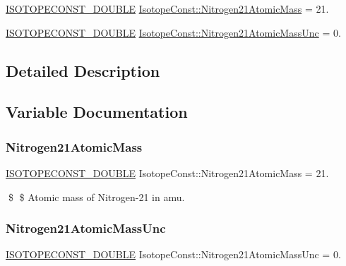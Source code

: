 \begin{DoxyCompactItemize}
\item 
\mbox{\hyperlink{group___isotope_const-_macros_ga8f45a7272ce02c0b4c65c44636ed719a}{I\+S\+O\+T\+O\+P\+E\+C\+O\+N\+S\+T\+\_\+\+D\+O\+U\+B\+LE}} \mbox{\hyperlink{group___isotope_const-_nitrogen-_n21_gabe10a45c94633701c7645c12357b7ab1}{Isotope\+Const\+::\+Nitrogen21\+Atomic\+Mass}} = 21.
\item 
\mbox{\hyperlink{group___isotope_const-_macros_ga8f45a7272ce02c0b4c65c44636ed719a}{I\+S\+O\+T\+O\+P\+E\+C\+O\+N\+S\+T\+\_\+\+D\+O\+U\+B\+LE}} \mbox{\hyperlink{group___isotope_const-_nitrogen-_n21_ga1016bb94d2fd08162dfe44f578a634f0}{Isotope\+Const\+::\+Nitrogen21\+Atomic\+Mass\+Unc}} = 0.
\end{DoxyCompactItemize}


\subsection{Detailed Description}


\subsection{Variable Documentation}
\mbox{\label{group___isotope_const-_nitrogen-_n21_gabe10a45c94633701c7645c12357b7ab1}} 
\subsubsection{\texorpdfstring{Nitrogen21\+Atomic\+Mass}{Nitrogen21AtomicMass}}
{\footnotesize\ttfamily \mbox{\hyperlink{group___isotope_const-_macros_ga8f45a7272ce02c0b4c65c44636ed719a}{I\+S\+O\+T\+O\+P\+E\+C\+O\+N\+S\+T\+\_\+\+D\+O\+U\+B\+LE}} Isotope\+Const\+::\+Nitrogen21\+Atomic\+Mass = 21.}

\$ \$ Atomic mass of Nitrogen-\/21 in amu. \mbox{\label{group___isotope_const-_nitrogen-_n21_ga1016bb94d2fd08162dfe44f578a634f0}} 
\subsubsection{\texorpdfstring{Nitrogen21\+Atomic\+Mass\+Unc}{Nitrogen21AtomicMassUnc}}
{\footnotesize\ttfamily \mbox{\hyperlink{group___isotope_const-_macros_ga8f45a7272ce02c0b4c65c44636ed719a}{I\+S\+O\+T\+O\+P\+E\+C\+O\+N\+S\+T\+\_\+\+D\+O\+U\+B\+LE}} Isotope\+Const\+::\+Nitrogen21\+Atomic\+Mass\+Unc = 0.}

